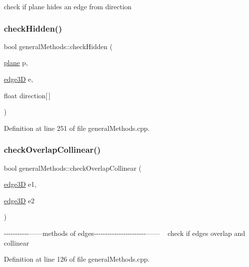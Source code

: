 check if plane hides an edge from direction \mbox{\label{namespacegeneral_methods_ab4e1b4b0a8b5b7697adddbb27950e639}} 
\subsubsection{\texorpdfstring{check\+Hidden()}{checkHidden()}\hspace{0.1cm}{\footnotesize\ttfamily [2/2]}}
{\footnotesize\ttfamily bool general\+Methods\+::check\+Hidden (\begin{DoxyParamCaption}\item[{\mbox{\hyperlink{structplane}{plane}}}]{p,  }\item[{\mbox{\hyperlink{structedge3_d}{edge3D}}}]{e,  }\item[{float}]{direction\mbox{[}$\,$\mbox{]} }\end{DoxyParamCaption})}



Definition at line 251 of file general\+Methods.\+cpp.

\mbox{\label{namespacegeneral_methods_aa7662b2bcff30f8983da23da5edfc766}} 
\subsubsection{\texorpdfstring{check\+Overlap\+Collinear()}{checkOverlapCollinear()}}
{\footnotesize\ttfamily bool general\+Methods\+::check\+Overlap\+Collinear (\begin{DoxyParamCaption}\item[{\mbox{\hyperlink{structedge3_d}{edge3D}}}]{e1,  }\item[{\mbox{\hyperlink{structedge3_d}{edge3D}}}]{e2 }\end{DoxyParamCaption})}

-\/-\/-\/-\/-\/-\/-\/-\/-\/-\/-\/------methods of edges-\/-\/-\/-\/-\/-\/-\/-\/-\/-\/-\/-\/-\/-\/-\/-\/-\/-\/-\/-\/-\/-\/-\/------ ~\newline
check if edges overlap and collinear 

Definition at line 126 of file general\+Methods.\+cpp.

